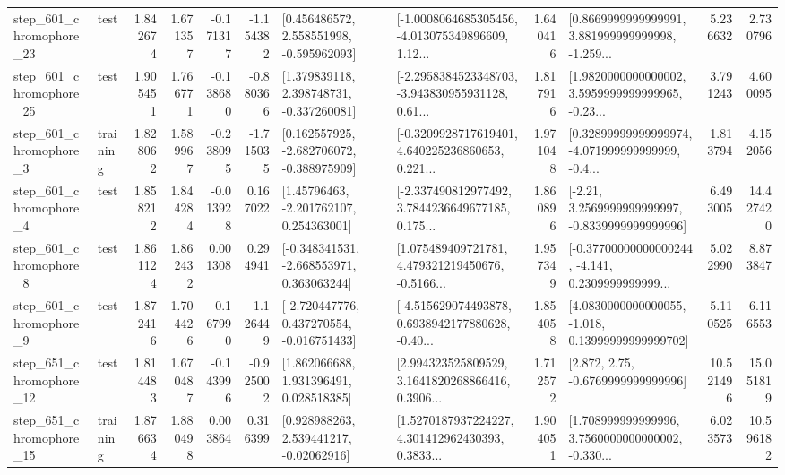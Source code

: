 \begin{tabular}{llrrrrllrlrr}
  step\_601\_chromophore\_23 &      test &      1.842674 &    1.671357 &     -0.171317 & -1.154382 &    [0.456486572, 2.558551998, -0.595962093] &  [-1.0008064685305456, -4.013075349896609, 1.12... &       1.640416 &  [0.8669999999999991, 3.881999999999998, -1.259... &            5.236632 &          2.730796 \\
  step\_601\_chromophore\_25 &      test &      1.905451 &    1.766771 &     -0.138680 & -0.880366 &    [1.379839118, 2.398748731, -0.337260081] &  [-2.2958384523348703, -3.943830955931128, 0.61... &       1.817916 &  [1.9820000000000002, 3.5959999999999965, -0.23... &            3.791243 &          4.600095 \\
   step\_601\_chromophore\_3 &  training &      1.828062 &    1.589967 &     -0.238095 & -1.715035 &   [0.162557925, -2.682706072, -0.388975909] &  [-0.3209928717619401, 4.640225236860653, 0.221... &       1.971048 &  [0.32899999999999974, -4.071999999999999, -0.4... &            1.813794 &          4.152056 \\
   step\_601\_chromophore\_4 &      test &      1.858212 &    1.844284 &     -0.013928 &  0.167022 &     [1.45796463, -2.201762107, 0.254363001] &  [-2.337490812977492, 3.7844236649677185, 0.175... &       1.860896 &   [-2.21, 3.2569999999999997, -0.8339999999999996] &            6.493005 &         14.427420 \\
   step\_601\_chromophore\_8 &      test &      1.861124 &    1.862432 &      0.001308 &  0.294941 &   [-0.348341531, -2.668553971, 0.363063244] &  [1.075489409721781, 4.479321219450676, -0.5166... &       1.957349 &  [-0.37700000000000244, -4.141, 0.2309999999999... &            5.022990 &          8.873847 \\
   step\_601\_chromophore\_9 &      test &      1.872416 &    1.704426 &     -0.167990 & -1.126449 &   [-2.720447776, 0.437270554, -0.016751433] &  [-4.515629074493878, 0.6938942177880628, -0.40... &       1.854058 &  [4.0830000000000055, -1.018, 0.13999999999999702] &            5.110525 &          6.116553 \\
  step\_651\_chromophore\_12 &      test &      1.814483 &    1.670487 &     -0.143996 & -0.925002 &     [1.862066688, 1.931396491, 0.028518385] &  [2.994323525809529, 3.1641820268866416, 0.3906... &       1.712572 &                 [2.872, 2.75, -0.6769999999999996] &           10.521496 &         15.051819 \\
  step\_651\_chromophore\_15 &  training &      1.876634 &    1.880498 &      0.003864 &  0.316399 &     [0.928988263, 2.539441217, -0.02062916] &  [1.5270187937224227, 4.301412962430393, 0.3833... &       1.904051 &  [1.708999999999996, 3.7560000000000002, -0.330... &            6.023573 &         10.596182 \\

\end{tabular}
